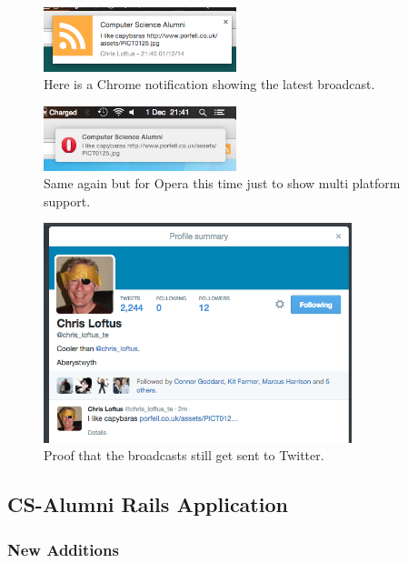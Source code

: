 \documentclass{article}
\begin{document}
\begin{figure}[H]
\centering
\includegraphics[width=0.5\textwidth]{chromenotification}
\caption{Here is a Chrome notification showing the latest broadcast.}
\end{figure}

\begin{figure}[H]
\centering
\includegraphics[width=0.5\textwidth]{operanotification}
\caption{Same again but for Opera this time just to show multi platform support.}
\end{figure}

\begin{figure}[H]
\centering
\includegraphics[width=0.8\textwidth]{twitterbc}
\caption{Proof that the broadcasts still get sent to Twitter.}
\end{figure}


\subsection{CS-Alumni Rails Application}

\subsubsection{New Additions}
\end{document}
